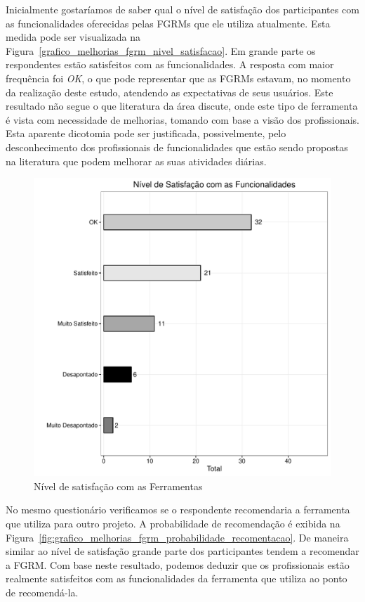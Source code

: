 Inicialmente gostaríamos de saber qual o nível de satisfação dos participantes
com as funcionalidades oferecidas pelas FGRMs que ele utiliza atualmente.
Esta medida pode ser visualizada na
Figura~\ref{grafico_melhorias_fgrm_nivel_satisfacao}. Em grande parte os
respondentes estão satisfeitos com as funcionalidades. A resposta com maior
frequência foi \textit{OK}, o que pode representar que as FGRMs estavam, no
momento da realização deste estudo, atendendo as expectativas de seus usuários.
Este resultado não segue o que literatura da área discute, onde este tipo de
ferramenta é vista com necessidade de melhorias, tomando com base a visão dos
profissionais. Esta aparente dicotomia pode ser justificada, possivelmente, pelo
desconhecimento dos profissionais de funcionalidades que estão sendo propostas
na literatura que podem melhorar as suas atividades diárias.

\begin{figure}[htpb]
	\centering
	\includegraphics[width=0.8\linewidth]{./chapter-pesquisa-com-profissionais/img/grafico_melhorias_fgrm_nivel_satisfacao.pdf}
	\caption{Nível de satisfação com as Ferramentas}
\label{fig:grafico_melhorias_fgrm_nivel_satisfacao}
\end{figure}

No mesmo questionário verificamos se o respondente recomendaria a ferramenta que
utiliza para outro projeto. A probabilidade de recomendação é exibida na
Figura~\ref{fig:grafico_melhorias_fgrm_probabilidade_recomentacao}. De maneira
similar ao nível de satisfação grande parte dos participantes tendem a
recomendar a FGRM\@. Com base neste resultado, podemos deduzir que os
profissionais estão realmente satisfeitos com as funcionalidades da ferramenta
que utiliza ao ponto de recomendá-la.

